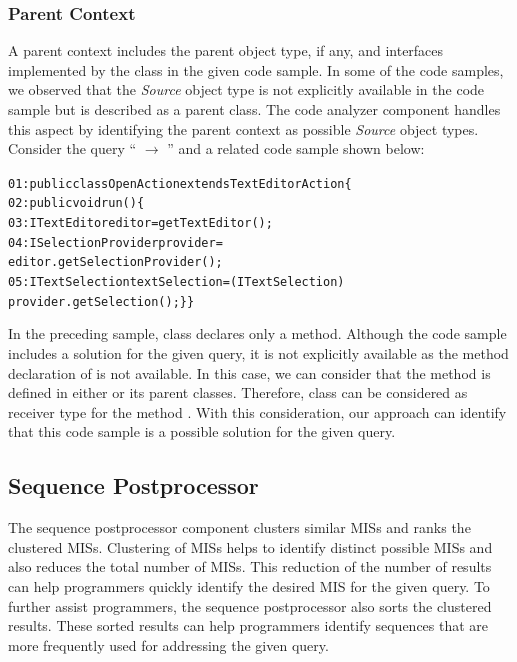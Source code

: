 \subsubsection{Parent Context}
\label{sec:parentcontext}
A parent context includes the parent object type, if any, and
interfaces implemented by the class in the given code sample. In some of the code
samples, we observed that the \emph{Source} object type is not
explicitly available in the code sample but is described as a
parent class. The code analyzer component handles this aspect by identifying the
parent context as possible \emph{Source} object types. Consider the
query `` $\rightarrow$
'' and a related code sample shown below:\vspace*{-2ex}

\begin{CodeOut}
\begin{alltt}
01:public class OpenAction extends TextEditorAction \{
02:\hspace*{0.1in}public void run() \{
03:\hspace*{0.3in}ITextEditor editor = getTextEditor();
04:\hspace*{0.3in}ISelectionProvider provider =
   \hspace*{0.6in}editor.getSelectionProvider();
05:\hspace*{0.3in}ITextSelection textSelection = (ITextSelection)
   \hspace*{0.6in}provider.getSelection(); \hspace*{0.1in}\}\hspace*{0.1in}\}
\end{alltt}
\end{CodeOut}

In the preceding sample, class  declares only a
 method. Although the code sample includes a solution
for the given query, it is not explicitly available as the method
declaration of  is not available. In this
case, we can consider that the method  is
defined in either  or its parent classes.
Therefore, class  can be considered as
receiver type for the method . With this consideration, our approach can
identify that this code sample is a possible solution for the given
query.
\subsection{Sequence Postprocessor}
\label{sec:miner} The sequence postprocessor component clusters similar MISs
and ranks the clustered MISs. Clustering of MISs helps to identify
distinct possible MISs and also reduces the total number of MISs.
This reduction of the number of results can help programmers quickly
identify the desired MIS for the given query. To further assist
programmers, the sequence postprocessor also sorts the clustered results.
These sorted results can help programmers identify sequences that
are more frequently used for addressing the given query.

